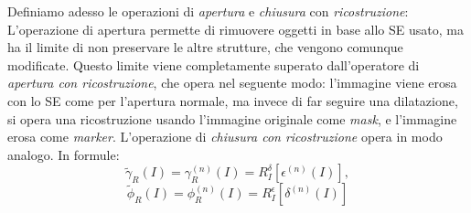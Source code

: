 \par Definiamo adesso le operazioni di \textit{apertura} e \textit{chiusura} con \textit{ricostruzione}:\\
L'operazione di apertura permette di rimuovere oggetti in base allo SE usato, ma ha il limite di non preservare le altre strutture, che vengono comunque modificate. Questo limite viene completamente superato dall'operatore di \textit{apertura con ricostruzione}, che opera nel seguente modo: l'immagine viene erosa con lo SE come per l'apertura normale, ma invece di far seguire una dilatazione, si opera una ricostruzione usando l'immagine originale come \textit{mask}, e l'immagine erosa come \textit{marker}. L'operazione di \textit{chiusura con ricostruzione} opera in modo analogo. In formule:
\begin{equation}
	\label{eq:opening-reconstruction}
	\tilde{\gamma}_{R}(I) = \gamma_{R}^{(n)}(I) = R_{I}^{\delta}[\epsilon^{(n)}(I)],
\end{equation}
\begin{equation}
	\label{eq:closing-reconstruction}
	\tilde{\phi}_{R}(I) = \phi_{R}^{(n)}(I) = R_{I}^{\epsilon}[\delta^{(n)}(I)]
\end{equation}

